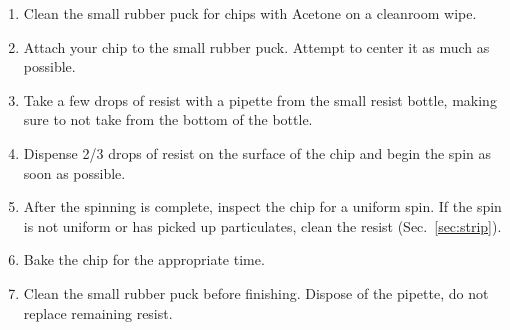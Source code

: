 
\begin{enumerate}
    \item Clean the small rubber puck for chips with Acetone on a cleanroom wipe.
    \item Attach your chip to the small rubber puck. Attempt to center it as much as possible.
    \item Take a few drops of resist with a pipette from the small resist bottle, making sure to not take from the bottom of the bottle.
    \item Dispense 2/3 drops of resist on the surface of the chip and begin the spin as soon as possible.
    \item After the spinning is complete, inspect the chip for a uniform spin. If the spin is not uniform or has picked up particulates, clean the resist (Sec.~\ref{sec:strip}).
    \item Bake the chip for the appropriate time.
    \item Clean the small rubber puck before finishing. Dispose of the pipette, do not replace remaining resist.
\end{enumerate}

